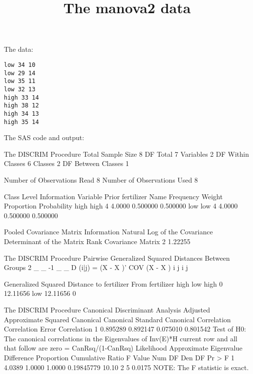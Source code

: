 \documentclass{article}
\title{The manova2 data}
\begin{document}
\maketitle
The data:
\begin{verbatim}
low 34 10 
low 29 14 
low 35 11 
low 32 13 
high 33 14 
high 38 12 
high 34 13 
high 35 14 
\end{verbatim}
The SAS code and output:
\begin{Woutput}
The DISCRIM Procedure
Total Sample Size        8          DF Total                 7
Variables                2          DF Within Classes        6
Classes                  2          DF Between Classes       1

Number of Observations Read              8
Number of Observations Used              8

                           Class Level Information
              Variable                                                  Prior
fertilizer    Name        Frequency       Weight    Proportion    Probability
high          high                4       4.0000      0.500000       0.500000
low           low                 4       4.0000      0.500000       0.500000

Pooled Covariance Matrix Information
               Natural Log of the
 Covariance    Determinant of the
Matrix Rank     Covariance Matrix
          2               1.22255

The DISCRIM Procedure
Pairwise Generalized Squared Distances Between Groups
 2         _   _       -1  _   _
D (i|j) = (X - X )' COV   (X - X )
            i   j           i   j

Generalized Squared Distance to fertilizer
From
fertilizer          high           low
high                   0      12.11656
low             12.11656             0

The DISCRIM Procedure
Canonical Discriminant Analysis
                           Adjusted    Approximate        Squared
           Canonical      Canonical       Standard      Canonical
         Correlation    Correlation          Error    Correlation
       1    0.895289       0.892147       0.075010       0.801542
                                                      Test of H0: The canonical correlations in the
                   Eigenvalues of Inv(E)*H               current row and all that follow are zero
                     = CanRsq/(1-CanRsq)
                                                     Likelihood Approximate
         Eigenvalue Difference Proportion Cumulative      Ratio     F Value Num DF Den DF Pr > F
       1     4.0389                1.0000     1.0000 0.19845779       10.10      2      5 0.0175
NOTE: The F statistic is exact.


\end{Woutput}
\end{document}
